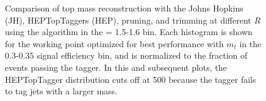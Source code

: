 \begin{figure}
\caption{Comparison of top mass reconstruction with the Johns Hopkins (JH), HEPTopTaggers (HEP), pruning, and trimming at different $R$ using the \antikt algorithm in the \pt = 1.5-1.6 \TeV bin. Each histogram is shown for the working point optimized for best performance with $m_t$ in the $0.3$-$0.35$ signal efficiency bin, and is normalized to the fraction of events passing the tagger. In this and subsequent plots, the HEPTopTagger distribution cuts off at 500 \GeV because the tagger fails to tag jets with a larger mass.}
\label{fig:topmass_histogram_HEP_JH}
\end{figure}

